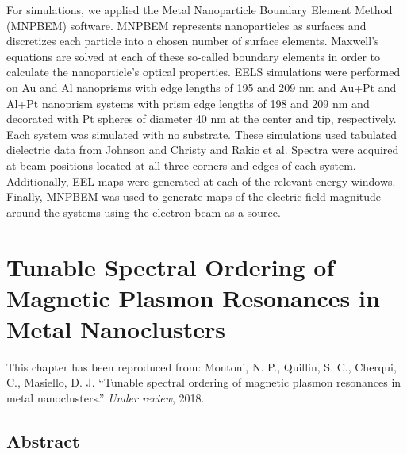 \documentclass [11pt, proquest] {uwthesis}[2016/11/22]
\begin{document}
For simulations, we applied the Metal Nanoparticle Boundary Element Method (MNPBEM) software. \cite{Hohenester2012,Hohenester2014} MNPBEM represents nanoparticles as surfaces and discretizes each particle into a chosen number of surface elements. Maxwell’s equations are solved at each of these so-called boundary elements in order to calculate the nanoparticle’s optical properties. EELS simulations were performed on Au and Al nanoprisms with edge lengths of 195 and 209 nm and Au+Pt and Al+Pt nanoprism systems with prism edge lengths of 198 and 209 nm and decorated with Pt spheres of diameter 40 nm at the center and tip, respectively. Each system was simulated with no substrate. These simulations used tabulated dielectric data from Johnson and Christy \cite{JC} and Rakic et al. \cite{Rakic} Spectra were acquired at beam positions located at all three corners and edges of each system. Additionally, EEL maps were generated at each of the relevant energy windows. Finally, MNPBEM was used to generate maps of the electric field magnitude around the systems using the electron beam as a source.

\newpage
\chapter{Tunable Spectral Ordering of Magnetic Plasmon Resonances in Metal Nanoclusters}

This chapter has been reproduced from:
 Montoni, N. P., Quillin, S. C., Cherqui, C., Masiello, D. J. ``Tunable spectral ordering of magnetic plasmon resonances in metal nanoclusters.'' {\it Under review}, 2018.

\section{Abstract}
\end{document}
